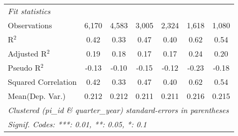 \begin{tabular}{lcccccc}
   \midrule
   \emph{Fit statistics}\\
   Observations                                               & 6,170           & 4,583           & 3,005     & 2,324    & 1,618          & 1,080\\  
   R$^2$                                                      & 0.42            & 0.33            & 0.47      & 0.40     & 0.62           & 0.54\\  
   Adjusted R$^2$                                             & 0.19            & 0.18            & 0.17      & 0.17     & 0.24           & 0.20\\  
   Pseudo R$^2$                                               & -0.13           & -0.10           & -0.15     & -0.12    & -0.23          & -0.18\\  
   Squared Correlation                                        & 0.42            & 0.33            & 0.47      & 0.40     & 0.62           & 0.54\\  
Mean(Dep. Var.) & 0.212 & 0.212 & 0.211 & 0.211 & 0.216 & 0.215 \\
   \midrule \midrule
   \multicolumn{7}{l}{\emph{Clustered (pi\_id \& quarter\_year) standard-errors in parentheses}}\\
   \multicolumn{7}{l}{\emph{Signif. Codes: ***: 0.01, **: 0.05, *: 0.1}}\\
\end{tabular}
\par\endgroup
